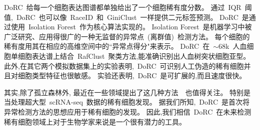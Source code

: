 DoRC~给每一个细胞表达图谱都单独给出了一个细胞稀有度分数。
通过~IQR~阈值,~DoRC~也可以像~RaceID~和~GiniClust~一样提供二元标签预测。
DoRC~是通过使用~Isolation Forest~作为核心算法实现的。
Isolation Forest~是机器学习中被广泛研究、应用得很广的一种无监督的异常点~(离群值)~检测方法。
每个细胞的稀有度用其在相应的高维空间中的``异常点得分"来表示。
DoRC~在~${\sim}68$k~人血细胞单细胞表达谱上结合~RafClust~聚类方法,能准确识别出人血树突状细胞亚型。
此外,在其它两个模拟数据集上的实验表明,~DoRC~可识别人工伪造的稀有细胞并且对细胞类型特征也很敏感。
实验还表明,~DoRC~是可扩展的,而且速度很快。


其实,除了孤立森林外,
最近在一些领域提出了这几种方法~\cite{aggarwal2015theoretical,zhao2019pyod,liu2019generative,weng2019multi}~也值得关注。
特别是当处理超大型~scRNA-seq~数据的稀有细胞发现。
据我们所知,~DoRC~是首次将异常检测方法的思想应用于稀有细胞的发现。
因此,我们相信~DoRC~在未来检测稀有细胞领域上对于生物学家来说是一个很有潜力的工具。